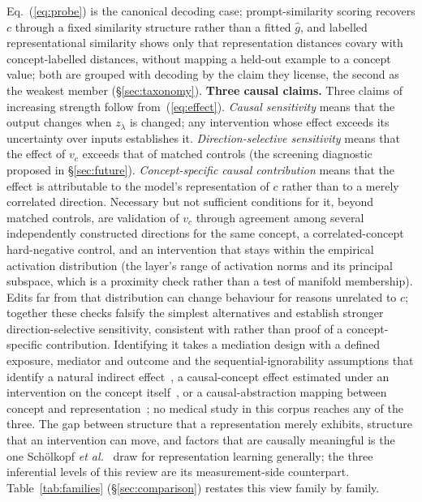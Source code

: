Eq.~(\ref{eq:probe}) is the canonical decoding case; prompt-similarity scoring recovers $c$ through a fixed similarity structure rather than a fitted $\hat g$, and labelled representational similarity shows only that representation distances covary with concept-labelled distances, without mapping a held-out example to a concept value; both are grouped with decoding by the claim they license, the second as the weakest member (\S\ref{sec:taxonomy}). \textbf{Three causal claims.} Three claims of increasing strength follow from~(\ref{eq:effect}).
\emph{Causal sensitivity} means that the output changes when $z_\lambda$ is changed; any
intervention whose effect exceeds its uncertainty over inputs establishes it. \emph{Direction-selective sensitivity}
means that the effect of $v_c$ exceeds that of matched controls (the screening diagnostic proposed in \S\ref{sec:future}). \emph{Concept-specific causal contribution} means that the effect is attributable to the model's representation of $c$ rather than to a merely correlated direction. Necessary but not sufficient conditions for it, beyond matched controls, are validation of $v_c$ through
agreement among several independently constructed directions for the same concept, a
correlated-concept hard-negative control, and an intervention that stays within the empirical activation distribution (the layer's range of activation norms and its principal subspace, which is a proximity check rather than a test of manifold membership).
Edits far from that distribution can change behaviour for reasons unrelated to $c$; together these checks falsify the simplest alternatives and establish stronger direction-selective sensitivity, consistent with rather than proof of a concept-specific contribution. Identifying it takes a mediation design with a defined exposure, mediator and outcome and the sequential-ignorability assumptions that identify a natural indirect effect~\cite{pearl2001direct,imai2010mediation}, a causal-concept effect estimated under an intervention on the concept itself~\cite{goyal2019cace}, or a causal-abstraction mapping between concept and representation~\cite{geiger2021causal,geiger2023causal}; no medical study in this corpus reaches any of the three. The gap between structure that a representation merely exhibits, structure that an intervention can move, and factors that are causally meaningful is the one Sch\"olkopf \emph{et al.}~\cite{scholkopf2021causal} draw for representation learning generally; the three inferential levels of this review are its measurement-side counterpart. Table~\ref{tab:families} (\S\ref{sec:comparison}) restates this view family by family.

